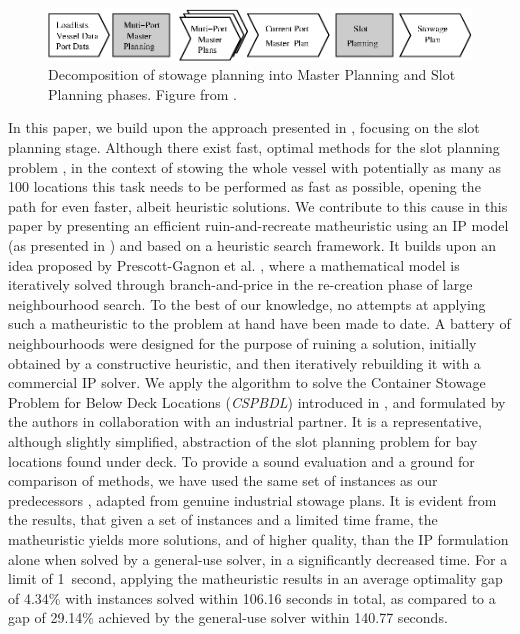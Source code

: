 \documentclass[preprint,12pt,3p]{elsarticle}
\begin{document}
\begin{figure}[ht]
\centering
\includegraphics[width=1.0\linewidth]{Figures/quad.eps}
\caption{Decomposition of stowage planning into Master Planning and Slot Planning phases. Figure from \cite{PDJB12}.}
\label{fig:decomposition}
\end{figure}

In this paper, we build upon the approach presented in \cite{PDJB11, PDJB12, DJJRA12}, focusing on the slot planning stage. Although there exist fast, optimal methods for the slot planning problem \cite{DJJRA12}, in the context of stowing the whole vessel with potentially as many as 100 locations this task needs to be performed as fast as possible, opening the path for even faster, albeit heuristic solutions. We contribute to this cause in this paper by presenting an efficient ruin-and-recreate matheuristic using an IP model (as presented in \cite{DPhD}) and based on a heuristic search framework. It builds upon an idea proposed by Prescott-Gagnon et al. \cite{PGDR-Math}, where a mathematical model is iteratively solved through branch-and-price in the re-creation phase of large neighbourhood search. To the best of our knowledge, no attempts at applying such a matheuristic to the problem at hand have been made to date. A battery of neighbourhoods were designed for the purpose of ruining a solution, initially obtained by a constructive heuristic, and then iteratively rebuilding it with a commercial IP solver. We apply the algorithm to solve the Container Stowage Problem for Below Deck Locations (\textit{CSPBDL}) introduced in \cite{DJJRA12}, and formulated by the authors in collaboration with an industrial partner. It is a representative, although slightly simplified, abstraction of the slot planning problem for bay locations found under deck. To provide a sound evaluation and a ground for comparison of methods, we have used the same set of instances as our predecessors \cite{DJJRA12}, adapted from genuine industrial stowage plans. It is evident from the results, that given a set of instances and a limited time frame, the matheuristic yields more solutions, and of higher quality, than the IP formulation alone when solved by a general-use solver, in a significantly decreased time. For a limit of 1~second, applying the matheuristic results in an average optimality gap of 4.34\% with instances solved within 106.16 seconds in total, as compared to a gap of 29.14\% achieved by the general-use solver within 140.77 seconds.
\end{document}
